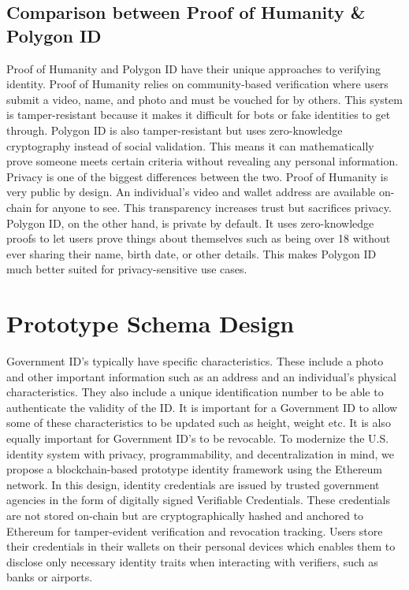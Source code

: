 \documentclass[conference]{IEEEtran}
\begin{document}
\subsection{Comparison between Proof of Humanity \& Polygon ID}
Proof of Humanity and Polygon ID have their unique approaches to verifying identity. Proof of Humanity relies on community-based verification where users submit a video, name, and photo and must be vouched for by others. This system is tamper-resistant because it makes it difficult for bots or fake identities to get through. Polygon ID is also tamper-resistant but uses zero-knowledge cryptography instead of social validation. This means it can mathematically prove someone meets certain criteria without revealing any personal information. Privacy is one of the biggest differences between the two. Proof of Humanity is very public by design. An individual's video and wallet address are available on-chain for anyone to see. This transparency increases trust but sacrifices privacy. Polygon ID, on the other hand, is private by default. It uses zero-knowledge proofs to let users prove things about themselves such as being over 18 without ever sharing their name, birth date, or other details. This makes Polygon ID much better suited for privacy-sensitive use cases.

\section{Prototype Schema Design}
Government ID's typically have specific characteristics. These include a photo and other important information such as an address and an individual's physical characteristics. They also include a unique identification number to be able to authenticate the validity of the ID. It is important for a Government ID to allow some of these characteristics to be updated such as height, weight etc. It is also equally important for Government ID's to be revocable. To modernize the U.S. identity system with privacy, programmability, and decentralization in mind, we propose a blockchain-based prototype identity framework using the Ethereum network. In this design, identity credentials are issued by trusted government agencies in the form of digitally signed Verifiable Credentials. These credentials are not stored on-chain but are cryptographically hashed and anchored to Ethereum for tamper-evident verification and revocation tracking. Users store their credentials in their wallets on their personal devices which enables them to disclose only necessary identity traits when interacting with verifiers, such as banks or airports.
\end{document}
